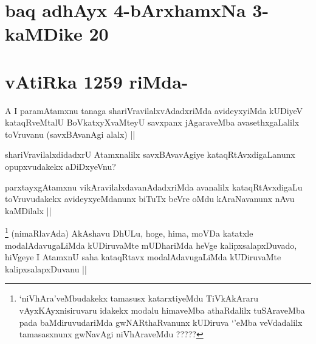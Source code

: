 \section*{baq adhAyx 4-bArxhamxNa 3- kaMDike 20}

\section*{vAtiRka 1259 riMda-}


\begin{artha}
A I paramAtamxnu tanaga shariVravilalxvAdadxriMda avideyxyiMda kUDiyeV kataqRveMtalU BoVkatxyXvaMteyU savxpanx jAgaraveMba avasethxgaLalilx toVruvanu (savxBAvanAgi alalx) ||
\end{artha}

\begin{artha}
shariVravilalxdidadxrU Atamxnalilx savxBAvavAgiye kataqRtAvxdigaLanunx opupxvudakekx aDiDxyeVnu?
\end{artha}

\begin{artha}
parxtayxgAtamxnu vikAravilalxdavanAdadxriMda avanalilx kataqRtAvxdigaLu toVruvudakekx avideyxyeMdanunx biTuTx beVre oMdu kAraNavanunx nAvu kaMDilalx ||
\end{artha}


\begin{artha}
\footnote{`niVhAra'veMbudakekx tamasusx katarxtiyeMdu TiVkAkAraru vAyxKAyxnisiruvaru idakekx modalu himaveMba athaRdalilx tuSAraveMba pada baMdiruvudariMda gwNARthaRvanunx kUDiruva `\stext'eMba veVdadalilx tamasasxnunx gwNavAgi niVhAraveMdu ?????}
(nimaRlavAda) AkAshavu DhULu, hoge, hima, moVDa katatxle modalAdavugaLiMda kUDiruvaMte mUDhariMda heVge kalipxsalapxDuvado, hiVgeye I AtamxnU saha kataqRtavx modalAdavugaLiMda kUDiruvaMte kalipxsalapxDuvanu ||
\end{artha}

